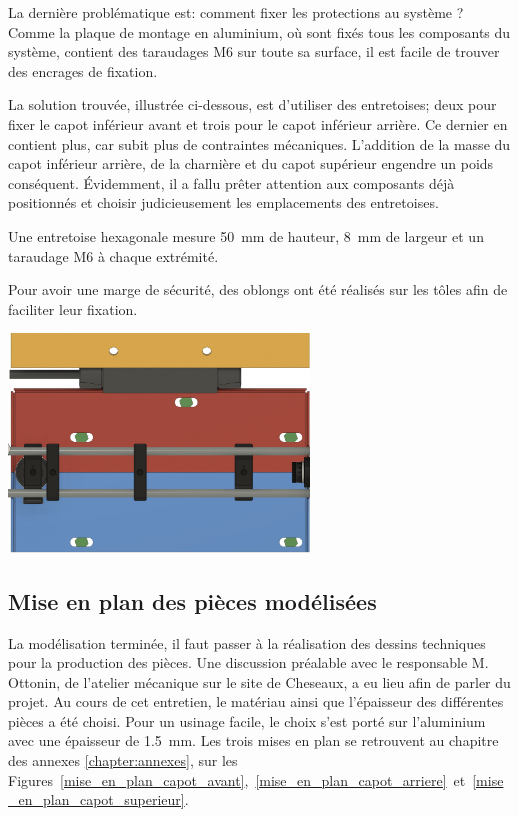 \begin{minipage}{\textwidth}
    La dernière problématique est: comment fixer les protections au système ? Comme la plaque de montage en aluminium, où sont fixés tous les composants du système, contient des taraudages M6 sur toute sa surface, il est facile de trouver des encrages de fixation.

    La solution trouvée, illustrée ci-dessous, est d'utiliser des entretoises; deux pour fixer le capot inférieur avant et trois pour le capot inférieur arrière. Ce dernier en contient plus, car subit plus de contraintes mécaniques. L'addition de la masse du capot inférieur arrière, de la charnière et du capot supérieur engendre un poids conséquent. Évidemment, il a fallu prêter attention aux composants déjà positionnés et choisir judicieusement les emplacements des entretoises.

    Une entretoise hexagonale mesure 50~mm de hauteur, 8~mm de largeur et un taraudage M6 à chaque extrémité.

    Pour avoir une marge de sécurité, des oblongs ont été réalisés sur les tôles afin de faciliter leur fixation.
    \vspace{1em}
    \begin{center}
        \includegraphics[width=0.6\textwidth]{assets/figures/Protections_laser/Securite_mecanique/Protection_entree_laser/contrainte_entretoises.jpeg}
    \end{center}
    \label{contrainte_entretoises}
\end{minipage}

\subsection{Mise en plan des pièces modélisées}
La modélisation terminée, il faut passer à la réalisation des dessins techniques pour la production des pièces. Une discussion préalable avec le responsable M. Ottonin, de l'atelier mécanique sur le site de Cheseaux, a eu lieu afin de parler du projet. Au cours de cet entretien, le matériau ainsi que l'épaisseur des différentes pièces a été choisi. Pour un usinage facile, le choix s'est porté sur l'aluminium avec une épaisseur de 1.5~mm. Les trois mises en plan se retrouvent au chapitre des annexes \ref{chapter:annexes}, sur les Figures~\ref{mise_en_plan_capot_avant},~\ref{mise_en_plan_capot_arriere}~et~\ref{mise_en_plan_capot_superieur}.






